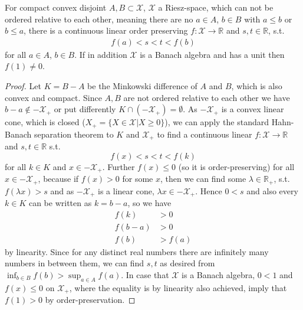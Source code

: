 \begin{lemma} \label{hahnbanachriesz}
    For compact convex disjoint \( A, B \subset \mathcal{X} \), \( \mathcal{X} \) a Riesz-space, which can not be ordered relative to each other,
    meaning there are no \( a \in A \), \( b \in B \) with \( a \leq b \) or \( b \leq a \), there is a continuous linear
    order preserving \( f : \mathcal{X} \to \mathbb{R} \) and \( s, t \in \mathbb{R} \), s.t. 
    \begin{align*}
        f(a) < s < t < f(b)
    \end{align*}
    for all \( a \in A \), \( b \in B \). If in addition \( \mathcal{X} \) is a Banach algebra and has a unit then \( f(1) \neq 0 \).
\end{lemma}
\begin{proof}
    Let \( K = B - A \) be the Minkowski difference of \( A \) and \( B \), which is also convex and compact.
    Since \( A, B \) are not ordered relative to each other we have \( b - a \notin - \mathcal{X}_{+} \) or put differently
\( K \cap (- \mathcal{X}_{+}) = \emptyset \). As \( - \mathcal{X}_{+} \) is a convex linear cone, which is closed (\( X_{+} = \{X \in \mathcal{X} | X \geq 0 \} \)), we can apply the standard Hahn-Banach separation theorem to \( K \) and \( \mathcal{X}_{+} \) to find a continuous linear 
    \( f : \mathcal{X} \to \mathbb{R} \) and \( s, t \in \mathbb{R} \) s.t.
    \[
        f(x) < s < t < f(k)
    \]
    for all \( k \in K \) and \( x \in - \mathcal{X}_{+} \). Further \( f(x) \leq 0 \) (so it is order-preserving) 
    for all \( x \in - \mathcal{X}_{+} \), because if \( f(x) > 0 \) for some \( x \), 
    then we can find some \( \lambda \in \mathbb{R}_{+} \), s.t. \( f(\lambda x) > s \) and as \( - \mathcal{X}_{+} \) is a linear cone, 
    \( \lambda x \in - \mathcal{X}_{+} \).  Hence \( 0 < s \) and also 
    every \( k \in K \) can be written as \( k = b - a \), so we have 
    \begin{align*}
        f(k) &> 0 \\
        f(b - a) &> 0 \\
        f(b) &> f(a)
    \end{align*}
    by linearity. Since for any distinct real numbers there are infinitely many numbers in between them,
    we can find \( s, t \) as desired from \( \inf_{b \in B} f(b) > \sup_{a \in A} f(a) \).
    In case that \( \mathcal{X} \) is a Banach algebra, \( 0 < 1 \) and \( f(x) \leq 0 \) on \( \mathcal{X}_{+} \),
    where the equality is by linearity also achieved, imply that \( f(1) > 0 \) by order-preservation. 
\end{proof}

